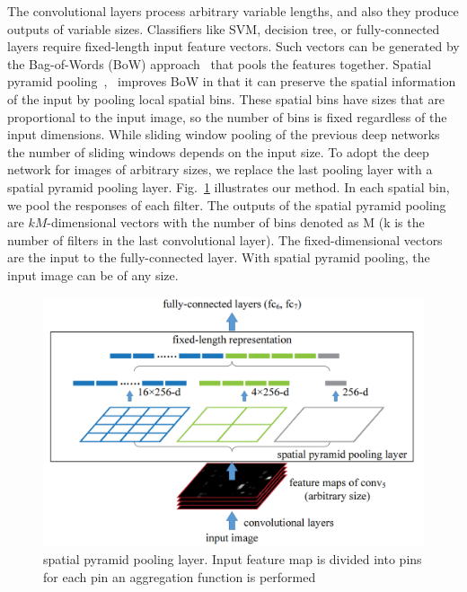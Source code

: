 The convolutional layers process arbitrary variable lengths, and also they produce outputs of variable sizes. Classifiers like SVM, decision tree, or fully-connected layers require fixed-length input feature vectors. Such vectors can be generated by the Bag-of-Words (BoW) approach~\cite{sivic2003video} that pools the features together. Spatial pyramid pooling~\cite{grauman2005pyramid},~\cite{lazebnik2006beyond} improves BoW in that it can preserve the spatial information of the input by pooling local spatial bins. These spatial bins have sizes that are proportional to the input image, so the number of bins is fixed regardless of the input dimensions. While sliding window pooling of the previous deep networks~\cite{krizhevsky2012imagenet} the number of sliding windows depends on the input size. To adopt the deep network for images of arbitrary sizes, we replace the last pooling layer with a spatial pyramid pooling layer.
Fig.~\ref{originalSpp} illustrates our method. In each spatial bin, we pool the responses of each filter. The outputs of the spatial pyramid pooling are $kM$-dimensional vectors with the number of bins denoted as M (k is the number of filters in the last convolutional layer). The fixed-dimensional vectors are the input to the fully-connected layer. With spatial pyramid pooling, the input image can be of any size.
\begin{figure}
    \begin{center}
        \includegraphics[width=\textwidth]{Figures/SPP.png}
        \caption{\label{originalSpp} spatial pyramid
        pooling layer. Input feature map is divided into pins for each pin an aggregation function is performed}
    \end{center}
\end{figure}


